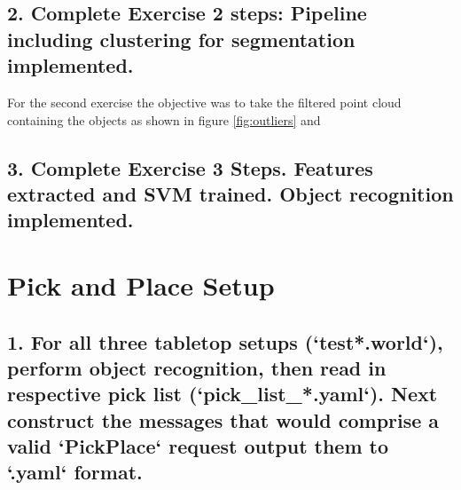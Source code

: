 \documentclass{article}
\begin{document}
\subsection{2. Complete Exercise 2 steps: Pipeline including clustering for segmentation implemented.}
For the second exercise the objective was to take the filtered point cloud containing the objects as shown in figure \ref{fig:outliers} and

\subsection{3. Complete Exercise 3 Steps.  Features extracted and SVM trained.  Object recognition implemented.}


\section{Pick and Place Setup}

\subsection{1. For all three tabletop setups (`test*.world`), perform object recognition, then read in respective pick list (`pick\_list\_*.yaml`). Next construct the messages that would comprise a valid `PickPlace` request output them to `.yaml` format.}


\end{document}

